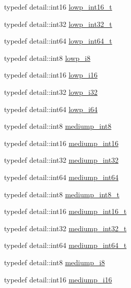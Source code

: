 \begin{CompactItemize}
typedef detail::int16 \hyperlink{group__gtc__type__precision_ge34c3d53c4c1434fc9f26538b0185667}{lowp\_\-int16\_\-t}
\item 
typedef detail::int32 \hyperlink{group__gtc__type__precision_gd9567c806dc39f534174eef42663119d}{lowp\_\-int32\_\-t}
\item 
typedef detail::int64 \hyperlink{group__gtc__type__precision_g14d72e76d57c7f28eca8e933816c9fd6}{lowp\_\-int64\_\-t}
\item 
typedef detail::int8 \hyperlink{group__gtc__type__precision_ga2e13ee29c90f75658beed6082541097}{lowp\_\-i8}
\item 
typedef detail::int16 \hyperlink{group__gtc__type__precision_gf7bbfd31bcec25a416ea94d09efb5451}{lowp\_\-i16}
\item 
typedef detail::int32 \hyperlink{group__gtc__type__precision_g70fd34e8b8cffc92739161284ed77328}{lowp\_\-i32}
\item 
typedef detail::int64 \hyperlink{group__gtc__type__precision_g1f4ded25f71c0f3b4518936d50b54b6e}{lowp\_\-i64}
\item 
typedef detail::int8 \hyperlink{group__gtc__type__precision_g3ee8faab2278c44c5785af04b7b18a14}{mediump\_\-int8}
\item 
typedef detail::int16 \hyperlink{group__gtc__type__precision_g4611997edb6c61606daa11990cf08798}{mediump\_\-int16}
\item 
typedef detail::int32 \hyperlink{group__gtc__type__precision_g0660a752402702f420f13c686a7fff29}{mediump\_\-int32}
\item 
typedef detail::int64 \hyperlink{group__gtc__type__precision_g603c695fe5cd677d3f72a81343e19a74}{mediump\_\-int64}
\item 
typedef detail::int8 \hyperlink{group__gtc__type__precision_g626ac5f73d3538e62a879d6c56abfb36}{mediump\_\-int8\_\-t}
\item 
typedef detail::int16 \hyperlink{group__gtc__type__precision_g478fab608cf43040013d719a3e03b194}{mediump\_\-int16\_\-t}
\item 
typedef detail::int32 \hyperlink{group__gtc__type__precision_gfd9b4bd9e4465aec63351b59100692c4}{mediump\_\-int32\_\-t}
\item 
typedef detail::int64 \hyperlink{group__gtc__type__precision_g555a2f85641550c232db473a9bb981f7}{mediump\_\-int64\_\-t}
\item 
typedef detail::int8 \hyperlink{group__gtc__type__precision_g28a8b5fd51072680bb55178c17cc7411}{mediump\_\-i8}
\item 
typedef detail::int16 \hyperlink{group__gtc__type__precision_g8454fc6a82c7bb787d0ac9663e08f63d}{mediump\_\-i16}

\end{CompactItemize}
